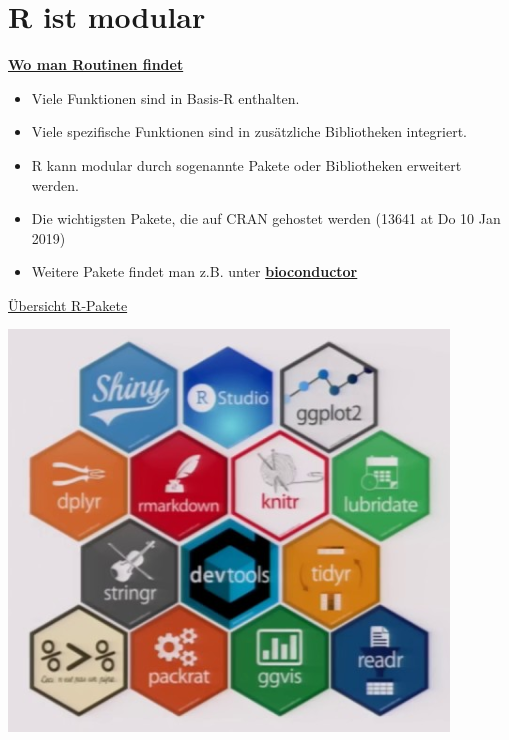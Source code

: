 \documentclass[ignorenonframetext,]{beamer}
\providecommand{\tightlist}{%
  \setlength{\itemsep}{0pt}\setlength{\parskip}{0pt}}
\begin{document}
\section{R ist modular}\label{r-ist-modular}

\begin{frame}{\href{https://stats.idre.ucla.edu/r/seminars/intro/}{\textbf{Wo
man Routinen findet}}}

\begin{itemize}
\tightlist
\item
  Viele Funktionen sind in Basis-R enthalten.
\item
  Viele spezifische Funktionen sind in zusätzliche Bibliotheken
  integriert.
\item
  R kann modular durch sogenannte Pakete oder Bibliotheken erweitert
  werden.
\item
  Die wichtigsten Pakete, die auf CRAN gehostet werden (13641 at Do 10
  Jan 2019)
\item
  Weitere Pakete findet man z.B. unter
  \href{www.bioconductor.org}{\textbf{bioconductor}}
\end{itemize}

\end{frame}

\begin{frame}{\href{https://www.youtube.com/watch?v=kKI9--Opmso}{Übersicht
R-Pakete}}

\includegraphics{figure/packages_overview.PNG}

\end{frame}
\end{document}
